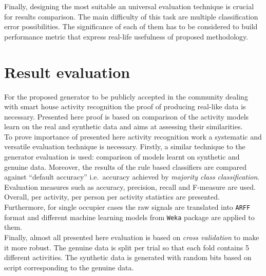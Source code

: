 \documentclass[10pt, a4paper, pdflatex, leqno, twoside, openright]{report}
\begin{document}
Finally, designing the most suitable an universal evaluation technique is crucial for results comparison. The main difficulty of this task are multiple classification error possibilities. The significance of each of them has to be considered to build performance metric that express real-life usefulness of proposed methodology.

\section{Result evaluation}
For the proposed generator to be publicly accepted in the community dealing with smart house activity recognition the proof of producing real-like data is necessary. Presented here proof is based on comparison of the activity models learn on the real and synthetic data and aims at assessing their similarities.\\

To prove importance of presented here activity recognition work a systematic and versatile evaluation technique is necessary. Firstly, a similar technique to the generator evaluation is used: comparison of models learnt on synthetic and genuine data. Moreover, the results of the rule based classifiers are compared against ``default accuracy'' i.e.\ accuracy achieved by \emph{majority class classification}.\\
Evaluation measures such as accuracy, precision, recall and F-measure are used. Overall, per activity, per person per activity statistics are presented. Furthermore, for single occupier cases the raw signals are translated into \texttt{ARFF} format and different machine learning models from \texttt{Weka} package are applied to them.\\
Finally, almost all presented here evaluation is based on \emph{cross validation} to make it more robust. The genuine data is split per trial so that each fold contains 5 different activities. The synthetic data is generated with random bits based on script corresponding to the genuine data.


\end{document}
